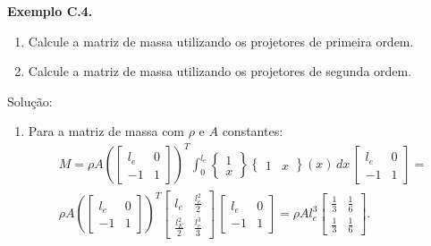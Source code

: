 \vspace{5mm}
\noindent
    \begin{tcolorbox}[breakable, colback=white, colframe=black, boxrule=0.4pt, arc=0pt, outer arc=0pt]
        \vspace{2mm} %
        \textbf{Exemplo C.4.} 
        
        \begin{enumerate}[label=\alph*), leftmargin=*]
            \item Calcule a matriz de massa utilizando os projetores de primeira ordem.
            \item Calcule a matriz de massa utilizando os projetores de segunda ordem.
        \end{enumerate}
        
        \hrulefill

        Solução: 
        \vspace{2mm}

        \begin{enumerate}[label=\alph*), leftmargin=*]
            \item Para a matriz de massa com $\rho$ e $A$ constantes:
            $$\begin{aligned}
                M = \rho A  \left(\begin{bmatrix} l_e  & 0 \\ -1 & 1 \end{bmatrix}\right)^T \int_{0}^{l_e}  \begin{Bmatrix} 1 \\ x \end{Bmatrix} \begin{Bmatrix} 1 & x \end{Bmatrix}(x) \, dx \,\begin{bmatrix} l_e  & 0 \\ -1 & 1 \end{bmatrix} = \\
                \rho A \left(\begin{bmatrix} l_e  & 0 \\ -1 & 1 \end{bmatrix}\right)^T \begin{bmatrix} l_e  & \frac{l_e^2}{2} \\ \frac{l_E^2}{2} & \frac{l_e^3}{3} \end{bmatrix} \, \begin{bmatrix} l_e  & 0 \\ -1 & 1 \end{bmatrix} = \rho A l_e^3 \begin{bmatrix} \frac{1}{3} & \frac{1}{6} \\ \frac{1}{3} & \frac{1}{6} \end{bmatrix}.
            \end{aligned}$$
            

\end{enumerate}
\end{tcolorbox}
